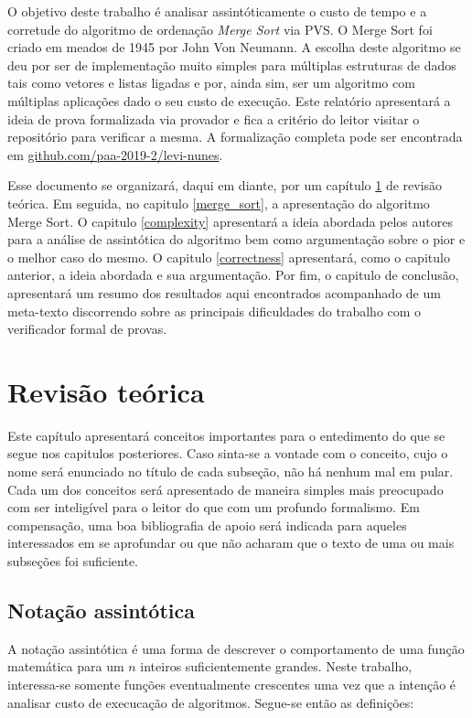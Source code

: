 \documentclass[12pt]{article}
\theoremstyle{definition}
\begin{document}
O objetivo deste trabalho é analisar assintóticamente o custo de tempo e a corretude do algoritmo de ordenação \textit{Merge Sort} via PVS. O Merge Sort foi criado
em meados de 1945 por John Von Neumann. A escolha deste algoritmo se deu por ser de implementação muito simples para múltiplas estruturas de dados tais como
vetores e listas ligadas e por, ainda sim, ser um algoritmo com múltiplas aplicações dado o seu custo de execução. Este relatório apresentará a ideia de prova
formalizada via provador e fica a critério do leitor visitar o repositório para verificar a mesma. A formalização completa pode ser encontrada em \url{github.com/paa-2019-2/levi-nunes}.

Esse documento se organizará, daqui em diante, por um capítulo \ref{explaining} de revisão teórica. Em seguida, no capitulo \ref{merge_sort}, a apresentação do algoritmo Merge Sort. 
O capitulo \ref{complexity} apresentará a ideia abordada pelos autores para a análise de assintótica do algoritmo
bem como argumentação sobre o pior e o melhor caso do mesmo. O capitulo \ref{correctness} apresentará, como o capitulo anterior, a ideia abordada
e sua argumentação. Por fim, o capitulo de conclusão, apresentará um resumo dos resultados aqui encontrados acompanhado de um meta-texto discorrendo sobre
as principais dificuldades do trabalho com o verificador formal de provas.

\section{Revisão teórica}
\label{explaining}

Este capítulo apresentará conceitos importantes para o entedimento do que se segue nos capitulos posteriores. Caso sinta-se a vontade com o conceito, 
cujo o nome será enunciado no título de cada subseção, não há nenhum mal em pular. Cada um dos conceitos será apresentado de maneira simples mais preocupado
com ser inteligível para o leitor do que com um profundo formalismo. Em compensação, uma boa bibliografia de apoio será indicada para aqueles interessados em 
se aprofundar ou que não acharam que o texto de uma ou mais subseções foi suficiente.

\subsection{Notação assintótica}

A notação assintótica é uma forma de descrever o comportamento de uma função matemática para um $n$ inteiros suficientemente
grandes. Neste trabalho, interessa-se somente funções eventualmente crescentes uma vez que a intenção é analisar custo de execucação
de algoritmos. Segue-se então as definições:
\end{document}
